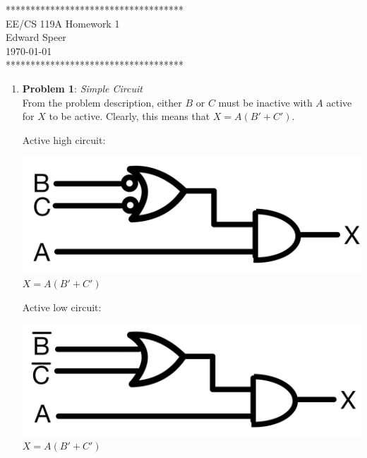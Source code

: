 \documentclass{article}
\newcommand{\HWNUM}{1}
\begin{document}

    \begin{center}
        ************************************ \\
        EE/CS 119A Homework \HWNUM \\
        Edward Speer \\
        \today \\
        ************************************
    \end{center}

    \begin{enumerate}
    
        \item \textbf{Problem 1}: \emph{Simple Circuit} \\
        
            From the problem description, either $B$ or $C$ must be inactive
            with $A$ active for $X$ to be active. Clearly, this means that
            $X = A(B' + C')$.

            Active high circuit:
            \begin{center} 
                \includegraphics[scale=0.1]{figs/p1a.jpeg} \\
                $X = A(B' + C')$
            \end{center}

            Active low circuit:
            \begin{center} 
                \includegraphics[scale=0.1]{figs/p1b.jpeg} \\
                $X = A(B' + C')$
            \end{center}


\end{enumerate}
\end{document}
